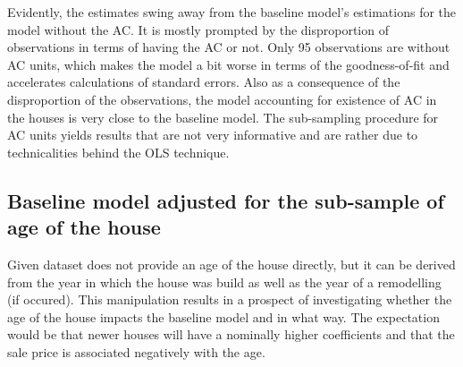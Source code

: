 \documentclass{article}
\begin{document}
Evidently, the estimates swing away from the baseline model's estimations for the model without the AC. It is mostly prompted by the disproportion of observations in terms of having the AC or not. Only 95 observations are without AC units, which makes the model a bit worse in terms of the goodness-of-fit and accelerates calculations of standard errors. Also as a consequence of the disproportion of the observations, the model accounting for existence of AC in the houses is very close to the baseline model. The sub-sampling procedure for AC units yields results that are not very informative and are rather due to technicalities behind the OLS technique.

\subsection{Baseline model adjusted for the sub-sample of age of the house}

Given dataset does not provide an age of the house directly, but it can be derived from the year in which the house was build as well as the year of a remodelling (if occured). This manipulation results in a prospect of investigating whether the age of the house impacts the baseline model and in what way. The expectation would be that newer houses will have a nominally higher coefficients and that the sale price is associated negatively with the age.
\end{document}
